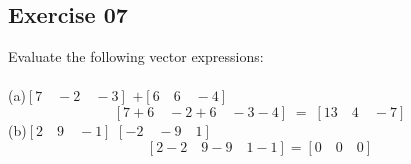 \documentclass[12pt, a4paper]{article}
\begin{document}
\newpage\quad
\subsection*{Exercise 07}
Evaluate the following vector expressions:\\\\
	(a)\quad $\left[7 \quad -2 \quad -3\right]$
		$+\left[6 \quad 6 \quad -4\right]$
		\begin{equation}
			\tag*{}
			\left[
				7+6 \quad -2+6 \quad -3-4
			\right] \; = \;
			\left[
				13 \quad 4 \quad -7
			\right]
		\end{equation}
	(b)\quad $\left[2 \quad 9 \quad -1\right]$
		$\left[-2 \quad -9 \quad 1\right]$
	\begin{equation}
		\tag*{}
		\left[2-2 \quad 9-9 \quad 1-1\right]
		= \left[0 \quad 0 \quad 0\right]
	\end{equation}
\end{document}
